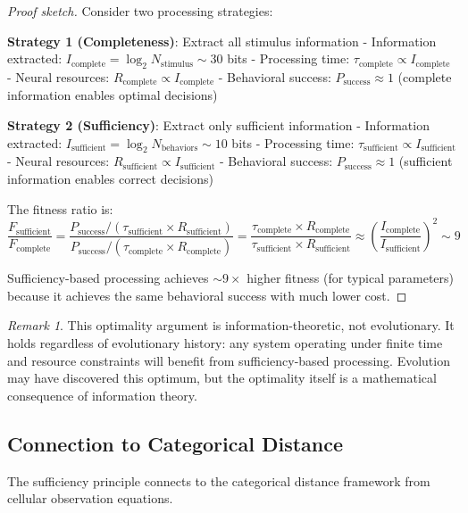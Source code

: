 \documentclass[aps,prd,twocolumn,superscriptaddress,floatfix,nofootinbib]{revtex4-2}
\theoremstyle{remark}
\newtheorem{remark}[theorem]{Remark}
\begin{document}
\begin{proof}[Proof sketch]
Consider two processing strategies:

\textbf{Strategy 1 (Completeness)}: Extract all stimulus information
- Information extracted: $I_{\text{complete}} = \log_2 N_{\text{stimulus}} \sim 30$ bits
- Processing time: $\tau_{\text{complete}} \propto I_{\text{complete}}$
- Neural resources: $R_{\text{complete}} \propto I_{\text{complete}}$
- Behavioral success: $P_{\text{success}} \approx 1$ (complete information enables optimal decisions)

\textbf{Strategy 2 (Sufficiency)}: Extract only sufficient information
- Information extracted: $I_{\text{sufficient}} = \log_2 N_{\text{behaviors}} \sim 10$ bits
- Processing time: $\tau_{\text{sufficient}} \propto I_{\text{sufficient}}$
- Neural resources: $R_{\text{sufficient}} \propto I_{\text{sufficient}}$
- Behavioral success: $P_{\text{success}} \approx 1$ (sufficient information enables correct decisions)

The fitness ratio is:
$$
\frac{F_{\text{sufficient}}}{F_{\text{complete}}} = \frac{P_{\text{success}} / (\tau_{\text{sufficient}} \times R_{\text{sufficient}})}{P_{\text{success}} / (\tau_{\text{complete}} \times R_{\text{complete}})} = \frac{\tau_{\text{complete}} \times R_{\text{complete}}}{\tau_{\text{sufficient}} \times R_{\text{sufficient}}} \approx \left(\frac{I_{\text{complete}}}{I_{\text{sufficient}}}\right)^2 \sim 9
$$

Sufficiency-based processing achieves $\sim 9\times$ higher fitness (for typical parameters) because it achieves the same behavioral success with much lower cost.
\end{proof}

\begin{remark}
This optimality argument is information-theoretic, not evolutionary. It holds regardless of evolutionary history: any system operating under finite time and resource constraints will benefit from sufficiency-based processing. Evolution may have discovered this optimum, but the optimality itself is a mathematical consequence of information theory.
\end{remark}

\subsection{Connection to Categorical Distance}

The sufficiency principle connects to the categorical distance framework from cellular observation equations.
\end{document}
